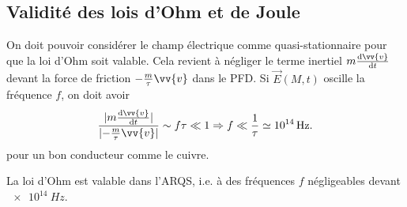 \documentclass[12pt,fancy]{cours}%
\begin{document}
\subsection{Validité des lois d'Ohm et de Joule}


On doit pouvoir considérer le champ électrique comme quasi-stationnaire pour que la loi d'Ohm soit valable. Cela revient à négliger le terme inertiel $m\frac{\d\vv{v}}{\d t}$ devant la force de friction $-\frac{m}{\tau}\vv{v}$ dans le PFD. Si $\Vec{E}(M,t)$ oscille la fréquence $f$, on doit avoir
\begin{equation}
\frac{\norme{m\frac{\d\vv{v}}{\d t}}}{\norme{-\frac{m}{\tau}\vv{v}}} \sim f \tau \ll 1 \Rightarrow  f \ll \frac{1}{\tau} \simeq\SI{e14}{Hz}.
\end{equation}
pour un bon conducteur comme le cuivre.
\begin{prop}\label{prop:}
  La loi d'Ohm est valable dans l'ARQS, i.e. à des fréquences $f$ négligeables devant $\SI{e14}{Hz}$.
\end{prop}
\end{document}
